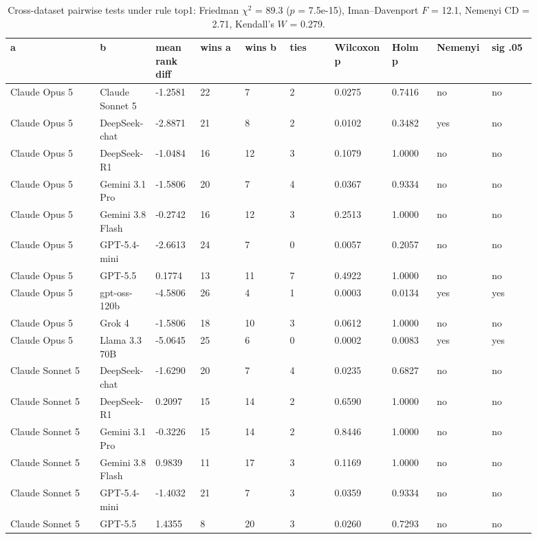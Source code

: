 \begin{landscape}
\tiny
\setlength{\tabcolsep}{3pt}
\begin{longtable}{p{0.162\linewidth}p{0.081\linewidth}p{0.081\linewidth}p{0.081\linewidth}p{0.081\linewidth}p{0.081\linewidth}p{0.081\linewidth}p{0.081\linewidth}p{0.081\linewidth}p{0.081\linewidth}}
\caption{Cross-dataset pairwise tests under rule top1: Friedman $\chi^2$ = 89.3 ($p$ = 7.5e-15), Iman--Davenport $F$ = 12.1, Nemenyi CD = 2.71, Kendall's $W$ = 0.279.}\label{tab:pairwise_top1}\\
\toprule
a & b & mean rank diff & wins a & wins b & ties & Wilcoxon p & Holm p & Nemenyi & sig .05 \\
\midrule
Claude Opus 5 & Claude Sonnet 5 & -1.2581 & 22 & 7 & 2 & 0.0275 & 0.7416 & no & no \\
Claude Opus 5 & DeepSeek-chat & -2.8871 & 21 & 8 & 2 & 0.0102 & 0.3482 & yes & no \\
Claude Opus 5 & DeepSeek-R1 & -1.0484 & 16 & 12 & 3 & 0.1079 & 1.0000 & no & no \\
Claude Opus 5 & Gemini 3.1 Pro & -1.5806 & 20 & 7 & 4 & 0.0367 & 0.9334 & no & no \\
Claude Opus 5 & Gemini 3.8 Flash & -0.2742 & 16 & 12 & 3 & 0.2513 & 1.0000 & no & no \\
Claude Opus 5 & GPT-5.4-mini & -2.6613 & 24 & 7 & 0 & 0.0057 & 0.2057 & no & no \\
Claude Opus 5 & GPT-5.5 & 0.1774 & 13 & 11 & 7 & 0.4922 & 1.0000 & no & no \\
Claude Opus 5 & gpt-oss-120b & -4.5806 & 26 & 4 & 1 & 0.0003 & 0.0134 & yes & yes \\
Claude Opus 5 & Grok 4 & -1.5806 & 18 & 10 & 3 & 0.0612 & 1.0000 & no & no \\
Claude Opus 5 & Llama 3.3 70B & -5.0645 & 25 & 6 & 0 & 0.0002 & 0.0083 & yes & yes \\
Claude Sonnet 5 & DeepSeek-chat & -1.6290 & 20 & 7 & 4 & 0.0235 & 0.6827 & no & no \\
Claude Sonnet 5 & DeepSeek-R1 & 0.2097 & 15 & 14 & 2 & 0.6590 & 1.0000 & no & no \\
Claude Sonnet 5 & Gemini 3.1 Pro & -0.3226 & 15 & 14 & 2 & 0.8446 & 1.0000 & no & no \\
Claude Sonnet 5 & Gemini 3.8 Flash & 0.9839 & 11 & 17 & 3 & 0.1169 & 1.0000 & no & no \\
Claude Sonnet 5 & GPT-5.4-mini & -1.4032 & 21 & 7 & 3 & 0.0359 & 0.9334 & no & no \\
Claude Sonnet 5 & GPT-5.5 & 1.4355 & 8 & 20 & 3 & 0.0260 & 0.7293 & no & no \\

\end{longtable}
\end{landscape}
